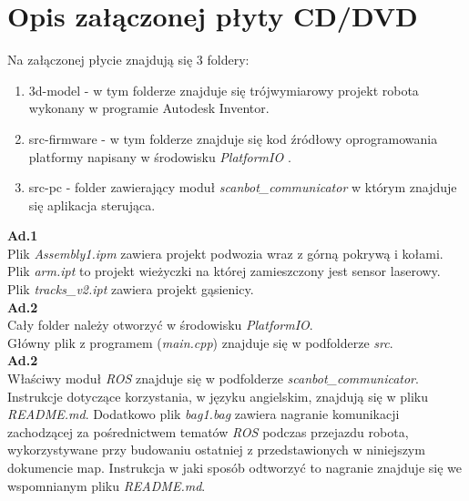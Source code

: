 \chapter{Opis załączonej płyty CD/DVD}
\label{sec:disc-addon}
Na załączonej płycie znajdują się 3 foldery:
\begin{enumerate}
    \item 3d-model - w tym folderze znajduje się trójwymiarowy projekt robota wykonany w programie Autodesk Inventor.
    \item src-firmware - w tym folderze znajduje się kod źródłowy oprogramowania platformy napisany w środowisku \emph{PlatformIO} \cite{platformio}.
    \item src-pc - folder zawierający moduł \emph{scanbot\_communicator} w którym znajduje się aplikacja sterująca.
\end{enumerate}

\noindent \textbf{Ad.1} \\  

Plik \emph{Assembly1.ipm} zawiera projekt podwozia wraz z górną pokrywą i kołami. \\ 

Plik \emph{arm.ipt} to projekt wieżyczki na której zamieszczony jest sensor laserowy. \\ 

Plik \emph{tracks\_v2.ipt} zawiera projekt gąsienicy. \\[10pt]

\noindent \textbf{Ad.2} \\ 

Cały folder należy otworzyć w środowisku \emph{PlatformIO}. \\ 
Główny plik z programem (\emph{main.cpp}) znajduje się w podfolderze \emph{src}. \\[10pt]

\noindent \textbf{Ad.2} \\ 

Właściwy moduł \emph{ROS} znajduje się w podfolderze \emph{scanbot\_communicator}. Instrukcje dotyczące korzystania, w języku angielskim, znajdują się w pliku \emph{README.md}. Dodatkowo plik \emph{bag1.bag} zawiera nagranie komunikacji zachodzącej za pośrednictwem tematów \emph{ROS} podczas przejazdu robota, wykorzystywane przy budowaniu ostatniej z przedstawionych w niniejszym dokumencie map. Instrukcja w jaki sposób odtworzyć to nagranie znajduje się we wspomnianym pliku \emph{README.md}.